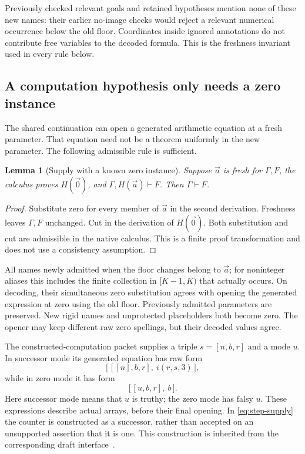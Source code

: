 \documentclass[11pt,letterpaper]{article}
\newtheorem{lemma}[theorem]{Lemma}
\theoremstyle{definition}
\begin{document}
Previously checked relevant goals and retained hypotheses mention none
of these new names: their earlier no-image checks would reject a
relevant numerical occurrence below the old floor.  Coordinates inside
ignored annotations do not contribute free variables to the decoded
formula.  This is the freshness invariant used in every rule below.

\subsection{A computation hypothesis only needs a zero instance}
\label{subsec:zero-supply}

The shared continuation can open a generated arithmetic equation at a
fresh parameter.  That equation need not be a theorem uniformly in the
new parameter.  The following admissible rule is sufficient.

\begin{lemma}[Supply with a known zero instance]
\label{lem:zero-supply}
Suppose $\vec a$ is fresh for $\Gamma,F$, the calculus proves
$H(\vec0)$, and $\Gamma,H(\vec a)\vdash F$.  Then
$\Gamma\vdash F$.
\end{lemma}

\begin{proof}
Substitute zero for every member of $\vec a$ in the second derivation.
Freshness leaves $\Gamma,F$ unchanged.  Cut in the derivation of
$H(\vec0)$.  Both substitution and cut are admissible in the native
calculus.  This is a finite proof transformation and does not use a
consistency assumption.
\end{proof}

All names newly admitted when the floor changes belong to $\vec a$;
for noninteger aliases this includes the finite collection in
$[K-1,K)$ that actually occurs.  On decoding, their simultaneous zero
substitution agrees with opening the generated expression at zero using
the old floor.  Previously admitted parameters are preserved.  New
rigid names and unprotected placeholders both become zero.  The opener
may keep different raw zero spellings, but their decoded values agree.

The constructed-computation packet supplies a triple $s=[n,b,r]$ and a
mode $u$.  In successor mode its generated equation has raw form
\[
 \bigl[\,[[n],b,r],\ i(r,s,3)\,\bigr],
 \tag{Step supply}\label{eq:step-supply}
\]
while in zero mode it has form
\[
                    \bigl[\,[u,b,r],\ b\,\bigr].
 \tag{Zero supply}\label{eq:base-supply}
\]
Here successor mode means that $u$ is truthy; the zero mode has falsy
$u$.  These expressions describe actual arrays, before their final
opening.  In \eqref{eq:step-supply} the counter is constructed as a
successor, rather than accepted on an unsupported assertion that it is
one.  This construction is inherited from the corresponding draft
interface~\cite{constructed}.
\end{document}
